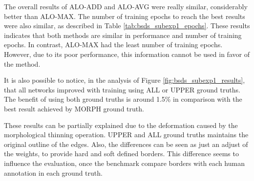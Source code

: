 The overall results of ALO-ADD and ALO-AVG were really similar, considerably better than ALO-MAX. %
The number of training epochs to reach the best results were also similar, as described in Table \ref{tab:bsds_subexp1_epochs}. %
These results indicates that both methods are similar in performance and number of training epochs.
In contrast, ALO-MAX had the least number of training epochs.
However, due to its poor performance, this information cannot be used in favor of the method.

It is also possible to notice, in the analysis of Figure \ref{fig:bsds_subexp1_results}, that all networks improved with training using ALL or UPPER ground truths.
The benefit of using both ground truths is around 1.5\% in comparison with the best result achieved by MORPH ground truth.



These results can be partially explained due to the deformation caused by the morphological thinning operation.
UPPER and ALL ground truths maintains the original outline of the edges.
Also, the differences can be seen as just an adjust of the weights, to provide hard and soft defined borders.
This difference seems to influence the evaluation, once the benchmark compare borders with each human annotation in each ground truth.

